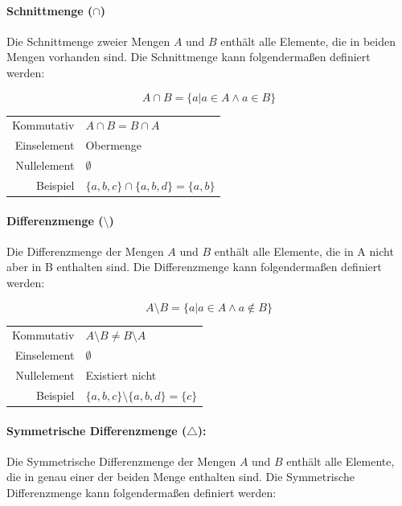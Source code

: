\documentclass[../main.tex]{subfiles}
\begin{document}
                \paragraph{Schnittmenge ($\cap$)}
                    Die Schnittmenge zweier Mengen $A$ und $B$ enthält alle Elemente, die in beiden Mengen vorhanden sind. Die Schnittmenge kann folgendermaßen definiert werden:
                    
                    \begin{equation}
                        A \cap B = \{a | a \in A \wedge a \in B\}
                    \end{equation}
                    
                    \begin{tabular}{ r l }
						Kommutativ & $A \cap B = B \cap A$ \\
						Einselement & Obermenge \\
						Nullelement & $\emptyset$ \\
                    	Beispiel & $\{a, b, c\} \cap \{a, b, d\} = \{a, b\}$
					\end{tabular}

                \paragraph{Differenzmenge ($\setminus$)}
                    Die Differenzmenge der Mengen $A$ und $B$ enthält alle Elemente, die in A nicht aber in B enthalten sind. Die Differenzmenge kann folgendermaßen definiert werden:
                    
                    \begin{equation}
                        A \setminus B = \{a | a \in A \wedge a \notin B\}
                    \end{equation}
                    
                    \begin{tabular}{ r l }
						Kommutativ & $A \setminus B \not = B \setminus A$ \\
						Einselement & $\emptyset$ \\
						Nullelement & Existiert nicht \\
                    	Beispiel & $\{a, b, c\} \setminus \{a, b, d\} = \{c\}$
					\end{tabular}
                    
                \paragraph{Symmetrische Differenzmenge ($\triangle$):}
                    Die Symmetrische Differenzmenge der Mengen $A$ und $B$ enthält alle Elemente, die in genau einer der beiden Menge enthalten sind. Die Symmetrische Differenzmenge kann folgendermaßen definiert werden:
                    
\end{document}
